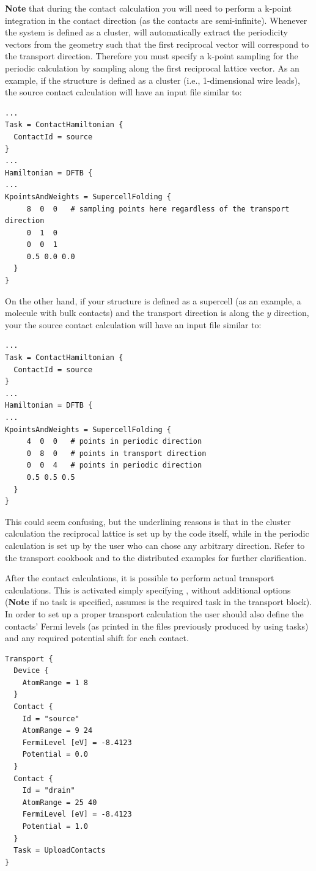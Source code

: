{\bf Note} that during the contact calculation you will need to perform a
k-point integration in the contact direction (as the contacts are
semi-infinite).  Whenever the system is defined as a cluster, \dftbp{} will
automatically extract the periodicity vectors from the geometry such that the
first reciprocal vector will correspond to the transport direction.  Therefore you
must specify a k-point sampling for the periodic calculation by sampling along
the first reciprocal lattice vector.  As an example, if the structure is defined
as a cluster (i.e., 1-dimensional wire leads), the source contact calculation
will have an input file similar to:

\begin{verbatim}
...
Task = ContactHamiltonian {
  ContactId = source
}
...
Hamiltonian = DFTB {
...
KpointsAndWeights = SupercellFolding {
     8  0  0   # sampling points here regardless of the transport direction
     0  1  0
     0  0  1
     0.5 0.0 0.0
  }
}
\end{verbatim}

On the other hand, if your structure is defined as a supercell (as an example, a
molecule with bulk contacts) and the transport direction is along the $y$
direction, your the source contact calculation will have an input file similar
to:

\begin{verbatim}
...
Task = ContactHamiltonian {
  ContactId = source
}
...
Hamiltonian = DFTB {
...
KpointsAndWeights = SupercellFolding {
     4  0  0   # points in periodic direction
     0  8  0   # points in transport direction
     0  0  4   # points in periodic direction
     0.5 0.5 0.5
  }
}
\end{verbatim}


This could seem confusing, but the underlining reasons is that in the cluster
calculation the reciprocal lattice is set up by the code itself, while in the
periodic calculation is set up by the user who can chose any arbitrary
direction.  Refer to the transport cookbook and to the distributed examples for
further clarification.

 After the contact calculations, it is
possible to perform actual transport calculations. This is activated simply
specifying , without additional options ({\bf Note} if
no task is specified, \dftbp{} assumes  is the required task
in the transport block). In order to set up a proper transport calculation the
user should also define the contacts' Fermi levels (as printed in the files
previously produced by using  tasks) and any required
potential shift for each contact.
\begin{verbatim}
Transport {
  Device {
    AtomRange = 1 8
  }
  Contact {
    Id = "source"
    AtomRange = 9 24
    FermiLevel [eV] = -8.4123
    Potential = 0.0
  }
  Contact {
    Id = "drain"
    AtomRange = 25 40
    FermiLevel [eV] = -8.4123
    Potential = 1.0
  }
  Task = UploadContacts
}
\end{verbatim}

